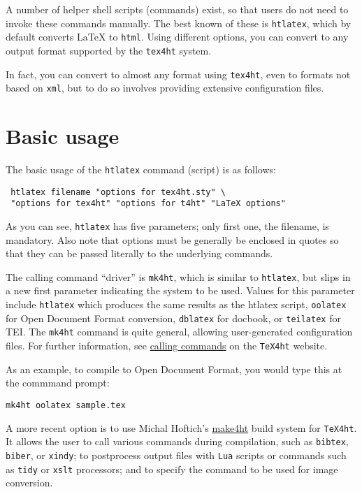 A number of helper shell scripts (commands) exist, so that users do not
need to invoke these commands manually. The best known of these is
\texttt{htlatex}, which by default converts LaTeX to \texttt{html}.
Using different options, you can convert to any output format supported
by the \texttt{tex4ht} system.

In fact, you can convert to almost any format using \texttt{tex4ht},
even to formats not based on \texttt{xml}, but to do so involves
providing extensive configuration files.

\hypertarget{basic-usage}{%
\section{Basic usage}\label{basic-usage}}

The basic usage of the \texttt{htlatex} command (script) is as follows:

\begin{verbatim}
 htlatex filename "options for tex4ht.sty" \ 
 "options for tex4ht" "options for t4ht" "LaTeX options"
\end{verbatim}

As you can see, \texttt{htlatex} has five parameters; only first one,
the filename, is mandatory. Also note that options must be generally be
enclosed in quotes so that they can be passed literally to the
underlying commands.

The calling command ``driver'' is \texttt{mk4ht}, which is similar to
\texttt{htlatex}, but slips in a new first parameter indicating the
system to be used. Values for this parameter include \texttt{htlatex}
which produces the same results as the htlatex script, \texttt{oolatex}
for Open Document Format conversion, \texttt{dblatex} for docbook, or
\texttt{teilatex} for TEI. The \texttt{mk4ht} command is quite general,
allowing user-generated configuration files. For further information,
see
\href{https://www.tug.org/applications/tex4ht/mn-commands.html\#QQ1-9-33}{calling
commands} on the \texttt{TeX4ht} website.

As an example, to compile to Open Document Format, you would type this
at the commmand prompt:

\begin{verbatim}
mk4ht oolatex sample.tex
\end{verbatim}

A more recent option is to use Michal Hoftich's
\href{https://github.com/michal-h21/make4ht}{make4ht} build system for
\texttt{TeX4ht}. It allows the user to call various commands during
compilation, such as \texttt{bibtex}, \texttt{biber}, or \texttt{xindy};
to postprocess output files with \texttt{Lua} scripts or commands such
as \texttt{tidy} or \texttt{xslt} processors; and to specify the command
to be used for image conversion.

